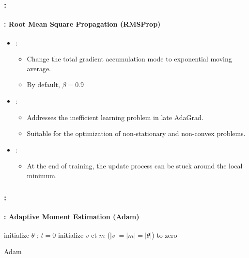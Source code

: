 \documentclass[xcolor=table]{beamer}
\begin{document}
\begin{frame}
	\frametitle{\insertshortsubtitle: \insertsection}
	\framesubtitle{\insertsubsection: Root Mean Square Propagation (RMSProp)}

	\begin{itemize}
		\item {}:
		\begin{itemize}
			\item Change the total gradient accumulation mode to exponential moving average.
			\item By default, $\beta = 0.9$
		\end{itemize}
		\item {}:
		\begin{itemize}
			\item Addresses the inefficient learning problem in late AdaGrad.
			\item Suitable for the optimization of non-stationary and non-convex problems.
		\end{itemize}
		\item {}:
		\begin{itemize}
			\item At the end of training, the update process can be stuck around the local minimum.
		\end{itemize}
	\end{itemize}

\end{frame}

\begin{frame}
	\frametitle{\insertshortsubtitle: \insertsection}
	\framesubtitle{\insertsubsection: Adaptive Moment Estimation (Adam)}
	
	\begin{algorithm}[H]
		\KwResult{$ \theta $}
		initialize $ \theta $ ; $ t = 0 $\;
		initialize $v$ et $m$ ($|v| = |m| = |\theta|$) to zero\;
		\caption{Adam \cite{2015-kingma-ba}}
	\end{algorithm}

\end{frame}
\end{document}
